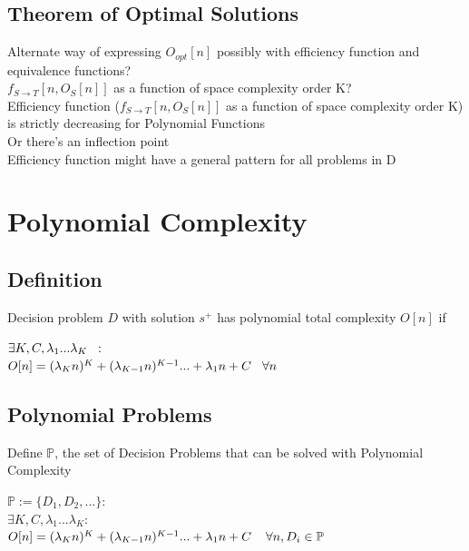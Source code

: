 \documentclass[11pt]{article}
\begin{document}
\subsection{Theorem of Optimal Solutions}
Alternate way of expressing $O_{opt}[n]$ possibly with efficiency function and equivalence functions?\\
$f_{S \rightarrow T}[n,O_S[n]]$ as a function of space complexity order K?\\
Efficiency function ($f_{S \rightarrow T}[n,O_S[n]]$ as a function of space complexity order K) is strictly decreasing for Polynomial Functions\\
Or there's an inflection point\\
Efficiency function might have a general pattern for all problems in D








\newpage
\section{Polynomial Complexity}

\subsection{Definition}
Decision problem $D$ with solution $s^+$ has polynomial total complexity $O[n]$ if
\begin{center}
$\exists K,C,\lambda_1...\lambda_K \hspace{2mm} :$
\\ \vspace{2mm}
$O[n] = (\lambda_K n)^K + (\lambda_{K-1} n)^{K-1}... + \lambda_1 n + C \hspace{3mm} \forall n$
\end{center}





\subsection{Polynomial Problems}
Define $\mathbb{P}$, the set of Decision Problems that can be solved with Polynomial Complexity
\begin{center}
$
\mathbb{P} := \{D_1,D_2,...\} : 
$
\\
$
\exists K,C,\lambda_1...\lambda_K : 
$
\\
$
O[n] = (\lambda_K n)^K + (\lambda_{K-1} n)^{K-1}... + \lambda_1 n + C \hspace{4mm} \forall n, D_i \in \mathbb{P}
$
\end{center}
\end{document}
